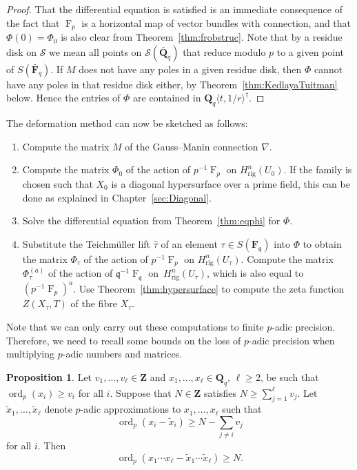 \documentclass[a4paper,11pt]{article}
\numberwithin{equation}{section}
\newcommand{\ZZ}{\mathbf{Z}} %
\newcommand{\QQ}{\mathbf{Q}} %
\newcommand{\FF}{\mathbf{F}} %
\DeclareMathOperator{\ord}{ord}          %
\DeclareMathOperator{\Frob}{F}           %
\providecommand{\Hrig}{H_{\text{rig}}}  %
\theoremstyle{definition}
\newtheorem{prop}[thm]{Proposition}
\begin{document}
\begin{proof}
That the differential equation is satisfied is an immediate consequence of the 
fact that $\Frob_p$ is a horizontal map of vector bundles with connection, and 
that $\Phi(0)=\Phi_0$ is also clear from Theorem~\ref{thm:frobstruc}. Note that
by a residue disk on $\mathcal{S}$ we mean all points on $\mathcal{S}(\bar{\QQ}_q)$ 
that reduce modulo $p$ to a given point of $S(\bar{\FF}_q)$.
If $M$ does not have any poles in a given residue disk, then $\Phi$ cannot have 
any poles in that residue disk either, by Theorem~\ref{thm:KedlayaTuitman} 
below. Hence the entries of $\Phi$ are contained in 
$\QQ_q \langle t, 1/r \rangle^{\dag}$.
\end{proof}

The deformation method can now be sketched as follows:
\begin{enumerate}[\it Step 1.]
\item Compute the matrix $M$ of the Gauss--Manin connection $\nabla$.
\item Compute the matrix $\Phi_0$ of the action of $p^{-1}\Frob_p$ on 
      $\Hrig^n(U_0)$. If the family is chosen such that $X_0$ is a diagonal 
      hypersurface over a prime field, this can be done as
      explained in Chapter~\ref{sec:Diagonal}.
\item Solve the differential equation from Theorem~\ref{thm:eqphi} for $\Phi$.
\item Substitute the Teichm\"uller lift $\hat{\tau}$ of an element 
      $\tau \in S(\FF_{\mathfrak{q}})$ into $\Phi$ to obtain the 
      matrix $\Phi_{\tau}$ of the action of $p^{-1}\Frob_p$ on 
      $\Hrig^n(U_{\tau})$. Compute the matrix $\Phi_{\tau}^{(a)}$ 
      of the action of $\mathfrak{q}^{-1} \Frob_{\mathfrak{q}}$ 
      on~$\Hrig^n(U_{\tau})$, which is also equal to $(p^{-1}\Frob_p)^a$.
      Use Theorem~\ref{thm:hypersurface} to compute the zeta function 
      $Z(X_{\tau},T)$ of the fibre $X_{\tau}$.
\end{enumerate}

Note that we can only carry out these computations to finite $p$-adic 
precision. Therefore, we need to recall some bounds on the loss of $p$-adic 
precision when multiplying $p$-adic numbers and matrices. 

\begin{prop} \label{prop:productval}
Let $v_1,\dotsc,v_{\ell} \in \ZZ$ and $x_1, \dotsc, x_{\ell} \in \mathbf{Q}_q$,  
$\ell \geq 2$, be such that $\ord_p(x_i) \geq v_i$ for all $i$. Suppose that 
$N \in \ZZ$ satisfies $N \geq \sum_{j=1}^{\ell} v_j$. Let 
$\tilde{x}_1, \dotsc, \tilde{x}_{\ell}$ denote $p$-adic approximations to 
$x_1, \dotsc, x_{\ell}$ such that 
\[
\ord_p\left(x_i - \tilde{x}_i\right) \geq N - \sum_{j \neq i} v_j
\] 
for all $i$.  Then 
\begin{equation*}
\ord_p(x_1 \dotsm x_{\ell} - \tilde{x}_1 \dotsm \tilde{x}_{\ell}) \geq N.
\end{equation*}
\end{prop}
\end{document}
